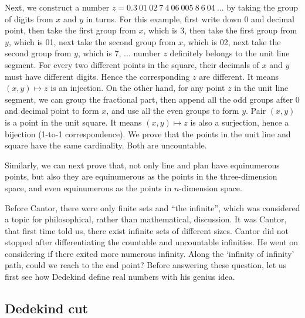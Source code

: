 \documentclass{article}
\begin{document}
Next, we construct a number $z = 0.3\ 01\ 02\ 7\ 4\ 06\ 005\ 8\ 6\ 04\ ...$ by taking the group of digits from $x$ and $y$ in turns. For this example, first write down 0 and decimal point, then take the first group from $x$, which is 3, then take the first group from $y$, which is 01, next take the second group from $x$, which is 02, next take the second group from $y$, which is 7, ... number $z$ definitely belongs to the unit line segment. For every two different points in the square, their decimals of $x$ and $y$ must have different digits. Hence the corresponding $z$ are different. It means $(x, y) \mapsto z$ is an injection. On the other hand, for any point $z$ in the unit line segment, we can group the fractional part, then append all the odd groups after 0 and decimal point to form $x$, and use all the even groups to form $y$. Pair $(x, y)$ is a point in the unit square. It means $(x, y) \mapsto z$ is also a surjection, hence a bijection (1-to-1 correspondence). We prove that the points in the unit line and square have the same cardinality. Both are uncountable.

Similarly, we can next prove that, not only line and plan have equinumerous points, but also they are equinumerous as the points in the three-dimension space, and even equinumerous as the points in $n$-dimension space.

Before Cantor, there were only finite sets and ``the infinite'', which was considered a topic for philosophical, rather than mathematical, discussion. It was Cantor, that first time told us, there exist infinite sets of different sizes. Cantor did not stopped after differentiating the countable and uncountable infinities. He went on considering if there exited more numerous infinity. Along the `infinity of infinity' path, could we reach to the end point? Before answering these question, let us first see how Dedekind define real numbers with his genius idea.

\begin{Exercise}
\end{Exercise}

\subsection{Dedekind cut}
\end{document}
